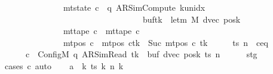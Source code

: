 \begin{isabellebody}
\ \ \ \ \ \ \ \ \ \ \ \ \ \ {\isasymand}\ mt{\isacharunderscore}{\kern0pt}state\ c{\isacharprime}{\kern0pt}{\isacharprime}{\kern0pt}\ {\isacharequal}{\kern0pt}\ {\isacharparenleft}{\kern0pt}q{\isacharcomma}{\kern0pt}\ AR{\isacharunderscore}{\kern0pt}SimCompute{\isacharcomma}{\kern0pt}\ k{\isacharunderscore}{\kern0pt}unidx\ {}{\isacharcomma}{\kern0pt}\ {}{\isacharcomma}{\kern0pt}\isanewline
\ \ \ \ \ \ \ \ \ \ \ \ \ \ \ \ \ \ \ \ \ \ \ \ \ \ \ \ \ \ \ \ \ \ buf{\isacharparenleft}{\kern0pt}tk\ {\isacharcolon}{\kern0pt}{\isacharequal}{\kern0pt}\ le{\isacharunderscore}{\kern0pt}tm\ M{\isacharparenright}{\kern0pt}{\isacharcomma}{\kern0pt}\ dvec{\isacharcomma}{\kern0pt}\ posk{\isacharparenright}{\kern0pt}\isanewline
\ \ \ \ \ \ \ \ \ \ \ \ \ \ {\isasymand}\ mt{\isacharunderscore}{\kern0pt}tape\ c{\isacharprime}{\kern0pt}{\isacharprime}{\kern0pt}\ {\isacharequal}{\kern0pt}\ mt{\isacharunderscore}{\kern0pt}tape\ c{\isacharprime}{\kern0pt}\isanewline
\ \ \ \ \ \ \ \ \ \ \ \ \ \ {\isasymand}\ mt{\isacharunderscore}{\kern0pt}pos\ c{\isacharprime}{\kern0pt}{\isacharprime}{\kern0pt}\ {\isacharequal}{\kern0pt}\ {\isacharparenleft}{\kern0pt}mt{\isacharunderscore}{\kern0pt}pos\ c{\isacharprime}{\kern0pt}{\isacharparenright}{\kern0pt}{\isacharparenleft}{\kern0pt}tk\ {\isacharcolon}{\kern0pt}{\isacharequal}{\kern0pt}\ Suc\ {\isacharparenleft}{\kern0pt}mt{\isacharunderscore}{\kern0pt}pos\ c{\isacharprime}{\kern0pt}\ tk{\isacharparenright}{\kern0pt}{\isacharparenright}{\kern0pt}{\isachardoublequoteclose}\isanewline
%
\isadelimproof
%
\endisadelimproof
%
\isatagproof
{}\isamarkupfalse%
\ {\isacharminus}{\kern0pt}\isanewline
\ \ \isamarkupfalse%
\ ts\ n\ \ c{\isacharprime}{\kern0pt}{\isacharunderscore}{\kern0pt}eq{\isacharcolon}{\kern0pt}\isanewline
\ \ \ \ \ \ {\isachardoublequoteopen}c{\isacharprime}{\kern0pt}\ {\isacharequal}{\kern0pt}\ Config\isactrlsub M\ {\isacharparenleft}{\kern0pt}q{\isacharcomma}{\kern0pt}\ AR{\isacharunderscore}{\kern0pt}SimRead{\isacharcomma}{\kern0pt}\ tk{\isacharcomma}{\kern0pt}\ {}{\isacharcomma}{\kern0pt}\ buf{\isacharcomma}{\kern0pt}\ dvec{\isacharcomma}{\kern0pt}\ posk{\isacharparenright}{\kern0pt}\ ts\ n{\isachardoublequoteclose}\isanewline
\ \ \ \ \isamarkupfalse%
\ stg\ \isamarkupfalse%
\ {\isacharparenleft}{\kern0pt}cases\ c{\isacharprime}{\kern0pt}{\isacharparenright}{\kern0pt}\ auto\isanewline
\ \ \isamarkupfalse%
\ {\isacharquery}{\kern0pt}a\ {\isacharequal}{\kern0pt}\ {\isachardoublequoteopen}{\isasymlambda}k{\isachardot}{\kern0pt}\ ts\ k\ {\isacharparenleft}{\kern0pt}n\ k{\isacharparenright}{\kern0pt}{\isachardoublequoteclose}\isanewline

\end{isabellebody}
